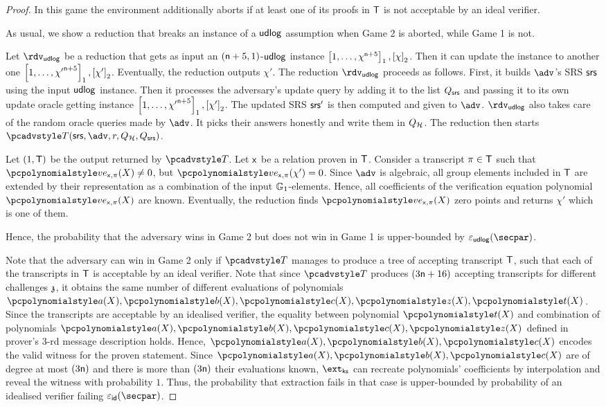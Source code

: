 \begin{proof}
  In this game the environment additionally aborts if at least one of its proofs in $\mathsf{T}$ is not acceptable by an ideal verifier.

  As usual, we show a reduction that breaks an instance of a $\mathsf{udlog}$ assumption when Game 2 is aborted, while Game 1 is not.

  Let $\rdvudlog$ be a reduction that gets as input an $(\mathsf{n} + 5, 1)$-$\mathsf{udlog}$ instance $\left[1, \ldots, \chi^{\mathsf{n} + 5}\right]_{1}, \left[\chi\right]_{2}$. Then it can update the instance to another one $\left[1, \ldots, {\chi'}^{\mathsf{n} + 5}\right]_{1}, \left[\chi'\right]_{2}$. Eventually, the reduction outputs $\chi'$.
	The reduction $\rdvudlog$ proceeds as follows.
	First, it builds $\adv$'s SRS $\mathsf{srs}$ using the input $\mathsf{udlog}$ instance. Then it processes the adversary's update query by adding it to the list $Q_{\mathsf{srs}}$ and passing it to its own update oracle getting instance $\left[1, \ldots, {\chi'}^{\mathsf{n} + 5}\right]_{1}, \left[\chi'\right]_{2}$. The updated SRS $\mathsf{srs}'$ is then computed and given to $\adv$. $\rdvdulog$ also takes care of the random oracle queries made by $\adv$. It picks their answers honestly and write them in $Q_{\mathcal{H}}$. The reduction then starts $\tdv(\srs, \adv, r, \Qro, \Qsrs)$.
	
  Let $(1, \mathsf{T})$ be the output returned by $\tdv$. Let $\mathsf{x}$ be a relation proven in $\mathsf{T}$.  Consider a transcript $\pi \in \mathsf{T}$ such that $\vereq_{\inp, \zkproof}(X) \neq 0$, but $\vereq_{\inp, \zkproof}(\chi') = 0$. Since $\adv$ is algebraic, all group elements included in $\mathsf{T}$ are extended by their representation as a combination of the input $\mathbb{G}_1$-elements. Hence, all coefficients of the verification equation polynomial $\vereq_{\inp, \zkproof}(X)$ are known. 
  Eventually, the reduction finds $\vereq_{\inp, \zkproof}(X)$ zero points and returns $\chi'$ which is one of them.
    
  Hence, the probability that the adversary wins in Game 2 but does not win in Game 1 is upper-bounded by $\epsudlog (\secpar)$.

  Note that the adversary can win in Game 2 only if $\tdv$ manages to produce a tree of accepting transcript $\mathsf{T}$, such that each of the transcripts in $\mathsf{T}$ is acceptable by an ideal verifier. Note that since $\tdv$ produces $(3 \mathsf{n} + 16)$ accepting transcripts for different challenges $\mathfrak{z}$, it obtains the same number of different evaluations of polynomials $\p{a} (X), \p{b} (X), \p{c} (X), \p{z} (X), \p{t} (X)$. Since the transcripts are acceptable by an idealised verifier, the equality between polynomial $\p{t} (X)$ and combination of polynomials $\p{a} (X), \p{b} (X), \p{c} (X), \p{z} (X)$ defined in prover's $3$-rd message description holds. Hence, $\p{a} (X), \p{b} (X), \p{c} (X)$ encodes the valid witness for the proven statement. Since $\p{a} (X), \p{b} (X), \p{c} (X)$ are of degree at most $(3 \mathsf{n})$ and there is more than $(3 \mathsf{n})$ their evaluations known, $\extcss$ can recreate polynomials' coefficients by interpolation and reveal the witness with probability $1$. Thus, the probability that extraction fails in that case is upper-bounded by probability of an idealised verifier failing $\epsid(\secpar)$.


\end{proof}
